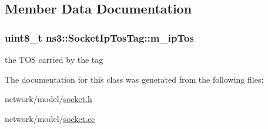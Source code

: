 \subsection{Member Data Documentation}
\subsubsection[{\texorpdfstring{m\+\_\+ip\+Tos}{m_ipTos}}]{\setlength{\rightskip}{0pt plus 5cm}uint8\+\_\+t ns3\+::\+Socket\+Ip\+Tos\+Tag\+::m\+\_\+ip\+Tos\hspace{0.3cm}{\ttfamily [private]}}\hypertarget{classns3_1_1SocketIpTosTag_a1f646611e53a92212859ab9a554843b1}{}\label{classns3_1_1SocketIpTosTag_a1f646611e53a92212859ab9a554843b1}


the T\+OS carried by the tag 



The documentation for this class was generated from the following files\+:\begin{DoxyCompactItemize}
\item 
network/model/\hyperlink{socket_8h}{socket.\+h}\item 
network/model/\hyperlink{socket_8cc}{socket.\+cc}\end{DoxyCompactItemize}
